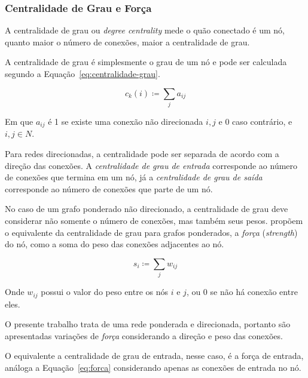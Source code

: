 \documentclass[12pt,a4paper]{article}
\theoremstyle{hypo}
\newcommand{\defn}{\coloneqq} %
\begin{document}
\subsubsection{Centralidade de Grau e Força} \label{sec:forca}

A centralidade de grau ou \textit{degree centrality} mede o quão conectado é um nó, quanto maior o número de conexões, maior a centralidade de grau.

A centralidade de grau é simplesmente o grau de um nó e pode ser calculada segundo a Equação~\ref{eq:centralidade-grau}.

\begin{equation} \label{eq:centralidade-grau}
c_k(i) \defn \sum_{j} a_{ij}
\end{equation}

Em que $a_{ij}$ é 1 se existe uma conexão não direcionada $i, j$ e 0 caso contrário, e $i,j \in N$. 

Para redes direcionadas, a centralidade pode ser separada de acordo com a direção das conexões. A \textit{centralidade de grau de entrada} corresponde ao número de conexões que termina em um nó, já a \textit{centralidade de grau de saída} corresponde ao número de conexões que parte de um nó.

No caso de um grafo ponderado não direcionado, a centralidade de grau deve considerar não somente o número de conexões, mas também seus pesos.  propõem o equivalente da centralidade de grau para grafos ponderados, a \textit{força} (\textit{strength}) do nó, como a soma do peso das conexões adjacentes ao nó.

\begin{equation} \label{eq:forca}
s_i \defn \sum_{j} w_{ij}
\end{equation}

Onde $w_{ij}$ possui o valor do peso entre os nós $i$ e $j$, ou 0 se não há conexão entre eles.

O presente trabalho trata de uma rede ponderada e direcionada, portanto são apresentadas variações de \textit{força} considerando a direção e peso das conexões.

O equivalente a centralidade de grau de entrada, nesse caso, é a força de entrada, análoga a Equação~\ref{eq:forca} considerando apenas as conexões de entrada no nó.
\end{document}
